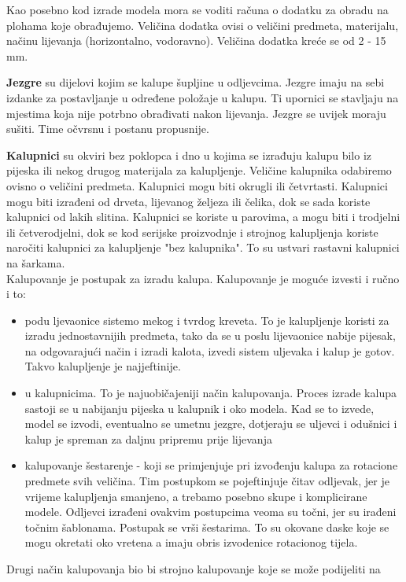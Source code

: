 \documentclass[a4paper,12pt]{article}
\numberwithin{figure}{section}
\begin{document}
Kao posebno kod izrade modela mora se voditi računa o dodatku za obradu na plohama koje obrađujemo. Veličina dodatka ovisi o veličini predmeta, materijalu, načinu lijevanja (horizontalno, vodoravno). Veličina dodatka kreće se od 2 - 15 mm.\par
\textbf{Jezgre} su dijelovi kojim se kalupe šupljine u odljevcima. Jezgre imaju na sebi izdanke za postavljanje u određene položaje u kalupu. Ti upornici se stavljaju na mjestima koja nije potrbno obrađivati nakon lijevanja. Jezgre se uvijek moraju sušiti. Time očvrsnu i postanu propusnije.\par
\textbf{Kalupnici} su okviri bez poklopca i dno u kojima se izrađuju kalupu bilo iz pijeska ili nekog drugog materijala za kalupljenje. Veličine kalupnika odabiremo ovisno o veličini predmeta. Kalupnici mogu biti okrugli ili četvrtasti. Kalupnici mogu biti izrađeni od drveta, lijevanog željeza ili čelika, dok se sada koriste kalupnici od lakih slitina. Kalupnici se koriste u parovima, a mogu biti i trodjelni ili četverodjelni, dok se kod serijske proizvodnje i strojnog kalupljenja koriste naročiti kalupnici za kalupljenje "bez kalupnika". To su ustvari rastavni kalupnici na šarkama.\\
Kalupovanje je postupak za izradu kalupa. Kalupovanje je moguće izvesti i ručno i to:
\begin{itemize}
\item podu ljevaonice sistemo mekog i tvrdog kreveta. To je kalupljenje koristi za izradu jednostavnijih predmeta, tako da se u poslu lijevaonice nabije pijesak, na odgovarajući način i izradi kalota, izvedi sistem uljevaka i kalup je gotov. Takvo kalupljenje je najjeftinije.
\item u kalupnicima. To je najuobičajeniji način kalupovanja. Proces izrade kalupa sastoji se u nabijanju pijeska u kalupnik i oko modela. Kad se to izvede, model se izvodi, eventualno se umetnu jezgre, dotjeraju se uljevci i odušnici i kalup je spreman za daljnu pripremu prije lijevanja
\item kalupovanje šestarenje - koji se primjenjuje pri izvođenju kalupa za rotacione predmete svih veličina. Tim postupkom se pojeftinjuje čitav odljevak, jer je vrijeme kalupljenja smanjeno, a trebamo posebno skupe i komplicirane modele. Odljevci izrađeni ovakvim postupcima veoma su točni, jer su irađeni točnim šablonama. Postupak se vrši šestarima. To su okovane daske koje se mogu okretati oko vretena a imaju obris izvodenice rotacionog tijela.
\end{itemize}
Drugi način kalupovanja bio bi strojno kalupovanje koje se može podijeliti na
\end{document}
